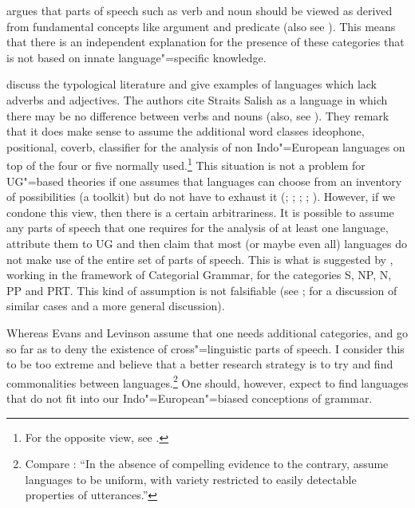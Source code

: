 \citet[]{Braine87a} argues that parts of speech such as verb and noun should be viewed as derived from fundamental concepts like argument and predicate
(also see ). This means that there is an independent explanation for the presence of these categories that is not
based on innate language"=specific knowledge.

\citet[Section~2.2.4]{EL2009a} discuss the typological literature and give examples of languages which lack adverbs and adjectives.
The authors cite Straits Salish as a language in which there may be no difference between verbs and nouns (also, see \citealp[]{EL2009b}).
They remark that it does make sense to assume the additional word classes ideophone, positional, coverb,
classifier for the analysis of non Indo"=European languages on top of the four or five normally used.\footnote{
	For the opposite view, see .
} 
This situation is not a problem for UG"=based theories if one assumes that languages can choose from an inventory of possibilities (a toolkit)
but do not have to exhaust it (\citealp[]{Jackendoff2002a-u}; \citealp[]{Newmeyer2005a}; \citealp*[]{FHC2005a};
\citealp[--7]{Chomsky2007a}; \citealp[, 58, 65]{CR2010a}). 
However, if we condone this view, then there is a certain arbitrariness. It is possible to assume any parts of speech that one requires
for the analysis of at least one language, attribute them to UG and then claim that most (or maybe even all) languages do not make use of
the entire set of parts of speech. This is what is suggested by \citet[]{Villavicencio2002a}, working in the framework
of Categorial Grammar, for the categories S, NP, N, PP and PRT. This kind of assumption is not falsifiable (see
\citealp[]{EL2009a}; \citealp[]{Tomasello2009a} for a discussion of similar cases and a more general discussion).

Whereas Evans and Levinson assume that one needs additional categories, \citet[]{Haspelmath2009a} and \citet[]{Croft2009a} go so far as to deny the existence of cross"=linguistic
parts of speech. I consider this to be too extreme and believe that a better research strategy is to try and find commonalities between
languages.\footnote{
  Compare :
``In the absence of compelling evidence to the contrary, assume languages to be uniform, with variety
restricted to easily detectable properties of utterances.''
} 
One should, however, expect to find languages that do not fit into our Indo"=European"=biased conceptions of grammar.

